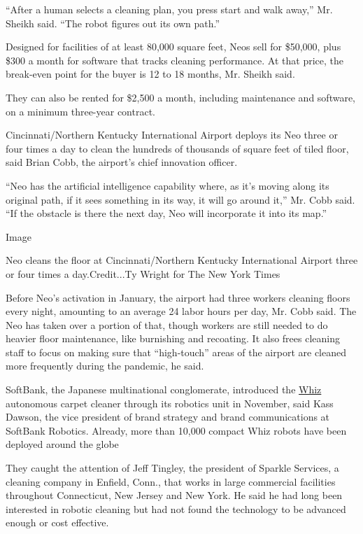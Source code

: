 ``After a human selects a cleaning plan, you press start and walk
away,'' Mr. Sheikh said. ``The robot figures out its own path.''

Designed for facilities of at least 80,000 square feet, Neos sell for
\$50,000, plus \$300 a month for software that tracks cleaning
performance. At that price, the break-even point for the buyer is 12 to
18 months, Mr. Sheikh said.

They can also be rented for \$2,500 a month, including maintenance and
software, on a minimum three-year contract.

Cincinnati/Northern Kentucky International Airport deploys its Neo three
or four times a day to clean the hundreds of thousands of square feet of
tiled floor, said Brian Cobb, the airport's chief innovation officer.

``Neo has the artificial intelligence capability where, as it's moving
along its original path, if it sees something in its way, it will go
around it,'' Mr. Cobb said. ``If the obstacle is there the next day, Neo
will incorporate it into its map.''

Image

Neo cleans the floor at Cincinnati/Northern Kentucky International
Airport three or four times a day.Credit...Ty Wright for The New York
Times

Before Neo's activation in January, the airport had three workers
cleaning floors every night, amounting to an average 24 labor hours per
day, Mr. Cobb said. The Neo has taken over a portion of that, though
workers are still needed to do heavier floor maintenance, like
burnishing and recoating. It also frees cleaning staff to focus on
making sure that ``high-touch'' areas of the airport are cleaned more
frequently during the pandemic, he said.

SoftBank, the Japanese multinational conglomerate, introduced the
\href{https://13779usreg20181102.com/us/whiz}{Whiz} autonomous carpet
cleaner through its robotics unit in November, said Kass Dawson, the
vice president of brand strategy and brand communications at SoftBank
Robotics. Already, more than 10,000 compact Whiz robots have been
deployed around the globe

They caught the attention of Jeff Tingley, the president of Sparkle
Services, a cleaning company in Enfield, Conn., that works in large
commercial facilities throughout Connecticut, New Jersey and New York.
He said he had long been interested in robotic cleaning but had not
found the technology to be advanced enough or cost effective.

